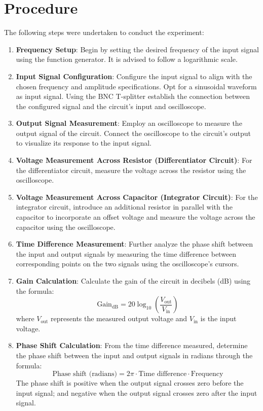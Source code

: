 \section{Procedure}
The following steps were undertaken to conduct the experiment:

\begin{enumerate}

    \item \textbf{Frequency Setup}: 
    Begin by setting the desired frequency of the input signal using the function generator. It is advised to follow a logarithmic scale.
    
    \item \textbf{Input Signal Configuration}: 
    Configure the input signal to align with the chosen frequency and amplitude specifications. Opt for a sinusoidal waveform as input signal. 
    Using the BNC T-splitter establish the connection between the configured signal and the circuit's input and oscilloscope.
    
    \item \textbf{Output Signal Measurement}: 
    Employ an oscilloscope to measure the output signal of the circuit. Connect the oscilloscope to the circuit's output to visualize its response to the input signal.
    
    \item \textbf{Voltage Measurement Across Resistor (Differentiator Circuit)}: 
    For the differentiator circuit, measure the voltage across the resistor using the oscilloscope. 
    
    \item \textbf{Voltage Measurement Across Capacitor (Integrator Circuit)}: 
    For the integrator circuit, introduce an additional resistor in parallel with the capacitor to incorporate an offset voltage and measure the voltage across the capacitor using the oscilloscope. 
    
    \item \textbf{Time Difference Measurement}: 
    Further analyze the phase shift between the input and output signals by measuring the time difference between corresponding points on the two signals using the oscilloscope's cursors.
    
    \item \textbf{Gain Calculation}: 
    Calculate the gain of the circuit in decibels (dB) using the formula: $$ \text{Gain}_{\text{dB}} = 20 \log_{10} \left( \frac{V_{\text{out}}}{V_{\text{in}}} \right) $$
    where $V_{\text{out}}$ represents the measured output voltage and $V_{\text{in}}$ is the input voltage.
    
    \item \textbf{Phase Shift Calculation}: 
    From the time difference measured, determine the phase shift between the input and output signals in radians through the formula:
    $$ \text{Phase shift (radians)} = 2\pi \cdot \text{Time difference} \cdot \text{Frequency}$$
    The phase shift is positive when the output signal crosses zero before the input signal; and negative when the output signal crosses zero after the input signal.

\end{enumerate}
